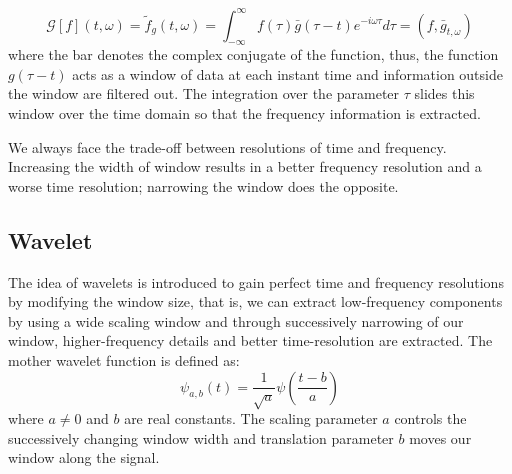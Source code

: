 \documentclass[10pt]{article}
\begin{document}
\begin{equation}\label{1}
\mathcal{G}[f](t,\omega) = \tilde{f}_g(t,\omega) = \int_{-\infty}^{\infty}f(\tau)\bar{g}(\tau-t)e^{-i\omega\tau} d\tau = (f, \bar{g}_{t,\omega})
\end{equation}
where the bar denotes the complex conjugate of the function, thus, the function $g(\tau-t)$ acts as a window of data at each instant time and information outside the window are filtered out. The integration over the parameter $\tau$ slides this window over the time domain so that the frequency information is extracted.
\par
We always face the trade-off between resolutions of time and frequency. Increasing the width of window results in a better frequency resolution and a worse time resolution; narrowing the window does the opposite.



\subsection{Wavelet}
The idea of wavelets is introduced to gain perfect time and frequency resolutions by modifying the window size, that is, we can extract low-frequency components by using a wide scaling window and through successively narrowing of our window, higher-frequency details and better time-resolution are extracted. The mother wavelet function is defined as:
\begin{equation}\label{2}
\psi_{a,b}(t)=\frac{1}{\sqrt{a}}\psi(\frac{t-b}{a})
\end{equation}
where $a\neq0$ and $b$ are real constants. The scaling parameter $a$ controls the successively changing window width and translation parameter $b$ moves our window along the signal.
\par
\end{document}
